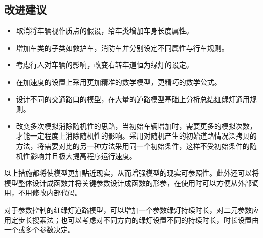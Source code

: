 \documentclass[a4paper,12pt]{article}
\numberwithin{equation}{section}
\begin{document}
	\subsection{改进建议}
	\begin{itemize}
		\item 取消将车辆视作质点的假设，给车类增加车身长度属性。
		\item 增加车类的子类如救护车，消防车并分别设定不同属性与行车规则。
		\item 考虑行人对车辆的影响，改变右转车道恒为绿灯的设定。
		\item 在加速度的设置上采用更加精准的数学模型，更精巧的数学公式。
		\item 设计不同的交通路口的模型，在大量的道路模型基础上分析总结红绿灯通用规则。
		\item 改变多次模拟消除随机性的思路，当初始车辆增加时，需要更多的模拟次数，才能一定程度上消除随机性的影响。采用对随机产生的初始道路情况深拷贝的方法，将需要对比的另一种方法采用同一个初始条件，这样不受初始条件的随机性影响并且极大提高程序运行速度。
	\end{itemize}
\indent 以上措施都将使模型更加贴近现实，从而增强模型的现实可参照性。此外还可以将模型整体设计成函数并将关键参数设计成函数的形参，在使用时可以方便从外部调用，不用修改内部代码。\par
对于参数控制的红绿灯道路模型，可以增加一个参数绿灯持续时长，对二元参数应用定步长搜索法；也可以考虑对不同方向的绿灯设置不同的持续时长，时长设置由一个或多个参数决定。
	\newpage
\end{document}
